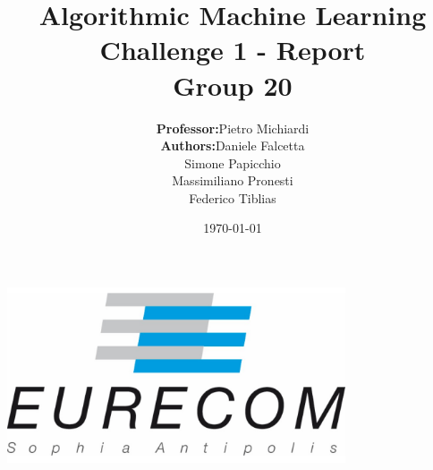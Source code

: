 \title{\Large Algorithmic Machine Learning  \\[0.5cm]
	\bf\Large Challenge 1 - Report \\[0.5cm]
	
	\bf\Large Group 20}

\author{\large 
	\begin{tabular}{rl}
		\textbf{Professor:} & Pietro Michiardi \\
		\textbf{Authors:} & Daniele Falcetta \\ & Simone Papicchio \\ & Massimiliano Pronesti \\ & Federico Tiblias
	\end{tabular}
	}
\date{\large \today}

\makeatletter
\begin{titlepage}
	\begin{center}
		{ \includegraphics[width=10cm]{assets/eurecom.png}}
		{\ \\ \ \\}
		\vbox{}\vspace{5cm}
		{\@title }\\[3cm]
		{\@author}\\[3cm]
		{\@date\\}
		
	\end{center}
\end{titlepage}
\makeatother